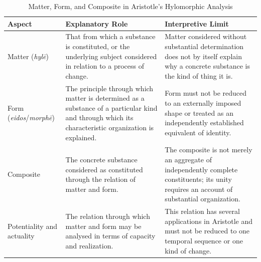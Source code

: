 %
%
%
%
%
%

\begin{table}[htbp]
\centering
\caption{Matter, Form, and Composite in Aristotle's Hylomorphic Analysis}
\label{tab:aristotle-matter-form-composite}

\small
\renewcommand{\arraystretch}{1.3}

\begin{tabularx}{\textwidth}{
    >{\raggedright\arraybackslash}p{}
    >{\raggedright\arraybackslash}p{}
    >{\raggedright\arraybackslash}X
}
\toprule
\textbf{Aspect} &
\textbf{Explanatory Role} &
\textbf{Interpretive Limit}
\\
\midrule

Matter (\textit{hylē})
&
That from which a substance is constituted, or the
underlying subject considered in relation to a process
of change.
&
Matter considered without substantial determination
does not by itself explain why a concrete substance
is the kind of thing it is.
\\

\addlinespace

Form (\textit{eidos}/\textit{morphē})
&
The principle through which matter is determined as
a substance of a particular kind and through which
its characteristic organization is explained.
&
Form must not be reduced to an externally imposed
shape or treated as an independently established
equivalent of identity.
\\

\addlinespace

Composite
&
The concrete substance considered as constituted
through the relation of matter and form.
&
The composite is not merely an aggregate of
independently complete constituents; its unity
requires an account of substantial organization.
\\

\addlinespace

Potentiality and actuality
&
The relation through which matter and form may be
analysed in terms of capacity and realization.
&
This relation has several applications in Aristotle
and must not be reduced to one temporal sequence
or one kind of change.
\\

\bottomrule
\end{tabularx}

\end{table}

